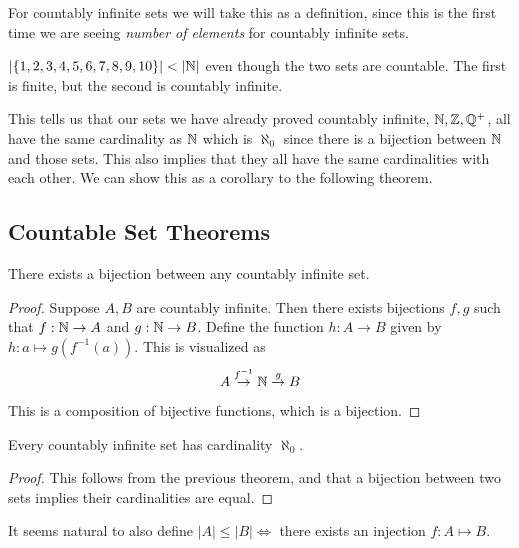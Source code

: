 \documentclass[main.tex]{subfiles}
\begin{document}
\begin{rem}
	For countably infinite sets we will take this as a definition, since this is the first time we are seeing \textit{number of elements} for countably infinite sets.
\end{rem}

\begin{rem}
	\(|\{1,2,3,4,5,6,7,8,9,10\}| < |\mathbb{N}|\) even though the two sets are countable. The first is finite, but the second is countably infinite.
\end{rem}

This tells us that our sets we have already proved countably infinite, \(\mathbb{N}, \mathbb{Z}, \mathbb{Q}^{+}\), all have the same cardinality as \(\mathbb{N}\) which is \(\aleph_0\) since there is a bijection between \(\mathbb{N}\) and those sets. This also implies that they all have the same cardinalities with each other. We can show this as a corollary to the following theorem.

\subsection{Countable Set Theorems}

\begin{thm}
	There exists a bijection between any countably infinite set.
\end{thm}

\begin{proof}
	Suppose \(A,B\) are countably infinite. Then there exists bijections \(f,g\) such that \(f : \mathbb{N} \rightarrow A\) and \(g : \mathbb{N} \rightarrow B\). Define the function \(h : A \rightarrow B\) given by \(h : a \mapsto g(f^{-1}(a))\). This is visualized as \[A \stackrel{f^{-1}}{\rightarrow} \mathbb{N} \stackrel{g}{\rightarrow} B\]
	
	This is a composition of bijective functions, which is a bijection.
\end{proof}

\begin{thm}
	Every countably infinite set has cardinality \(\aleph_0\).
\end{thm}

\begin{proof}
	This follows from the previous theorem, and that a bijection between two sets implies their cardinalities are equal.
\end{proof}

\begin{rem}
	It seems natural to also define \(|A| \leq |B| \Leftrightarrow\) there exists an injection \(f : A \mapsto B\).
\end{rem}
\end{document}
